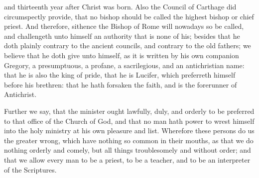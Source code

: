and thirteenth year after Christ was born. Also the Council of
Carthage did circumspectly provide, that no bishop should be called
the highest bishop or chief priest. And therefore, sithence the
Bishop of Rome will nowadays so be called, and challengeth unto himself
an authority that is none of his; besides that he doth plainly contrary
to the ancient councils, and contrary to the old fathers; we believe
that he doth give unto himself, as it is written by his own companion
Gregory, a presumptuous, a profane, a sacrilegious, and an antichristian
name: that he is also the king of pride, that he is Lucifer, which preferreth
himself before his brethren: that he hath forsaken the faith, and is
the forerunner of Antichrist.

Further we say, that the minister ought lawfully, duly, and orderly
to be preferred to that office of the Church of God, and that no man
hath power to wrest himself into the holy ministry at his own pleasure
and list. Wherefore these persons do us the greater wrong, which
have nothing so common in their mouths, as that we do nothing orderly
and comely, but all things troublesomely and without order; and that
we allow every man to be a priest, to be a teacher, and to be an interpreter
of the Scriptures.

